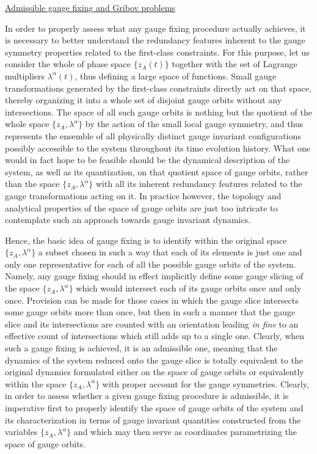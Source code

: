 \documentclass[a4paper,11pt]{article}
\begin{document}
\vspace{10pt}

\noindent\underline{Admissible gauge fixing and Gribov problems}

\vspace{10pt}

In order to properly assess\cite{JG1} what any gauge fixing procedure actually 
achieves, it is necessary to better understand the redundancy features inherent
to the gauge symmetry properties related to the first-class constraints.
For this purpose, let us consider the whole of phase space $\{z_A(t)\}$ 
together with the set of Lagrange multipliers $\lambda^\alpha(t)$, thus
defining a large space of functions. Small gauge transformations generated
by the first-class constraints directly act on that space, thereby organizing
it into a whole set of disjoint gauge orbits without any intersections.
The space of all such gauge orbits is nothing but the quotient of the
whole space $\{z_A,\lambda^\alpha\}$ by the action of the small local gauge
symmetry, and thus represents the ensemble of all physically distinct
gauge invariant configurations possibly accessible to the system throughout
its time evolution history. What one would in fact hope to be feasible
should be the dynamical description of the system, as well as its quantization,
on that quotient space of gauge orbits, rather than the space 
$\{z_A,\lambda^\alpha\}$ with all its inherent redundancy features related to 
the gauge transformations acting on it. In practice however, the topology 
and analytical properties of the space of gauge orbits are just too intricate
to contemplate such an approach towards gauge invariant dynamics.

Hence, the basic idea of gauge fixing is to identify within the original
space $\{z_A,\lambda^\alpha\}$ a subset chosen in such a way that each of
its elements is just one and only one representative for each of all the
possible gauge orbits of the system. Namely, any gauge fixing should in
effect implicitly define some gauge slicing of the space 
$\{z_A,\lambda^\alpha\}$ which would intersect each of its gauge orbits
once and only once. Provision can be made for those cases in which the
gauge slice intersects some gauge orbits more than once, but then in such
a manner that the gauge slice and its intersections are counted with
an orientation leading {\sl in fine\/} to an effective count of intersections
which still adds up to a single one. Clearly, when such a gauge fixing
is achieved, it is an admissible one, meaning that the dynamics of
the system reduced onto the gauge slice is totally equivalent to the
original dynamics formulated either on the space of gauge orbits or
equivalently within the space $\{z_A,\lambda^\alpha\}$ with proper
account for the gauge symmetries. Clearly, in order to assess whether
a given gauge fixing procedure is admissible, it is imperative first
to properly identify the space of gauge orbits of the system and its
characterization in terms of gauge invariant quantities constructed
from the variables $\{z_A,\lambda^\alpha\}$ and which may then serve as
coordinates parametrizing the space of gauge orbits.
\end{document}
